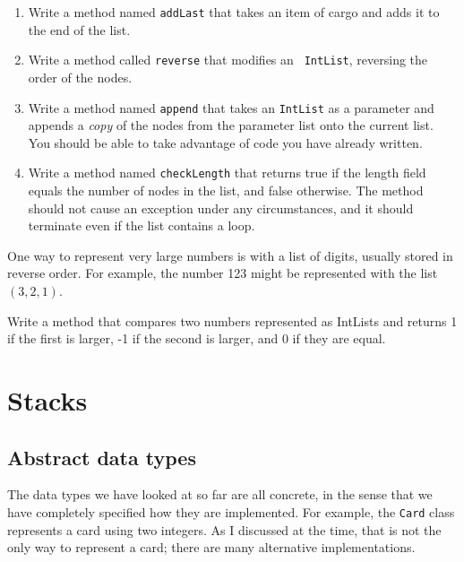 \begin{exercise}
\begin{enumerate}
\item Write a method named {\tt addLast} that takes an item of
cargo and adds it to the end of the list.

\item Write a method called {\tt reverse} that modifies an {\tt
IntList}, reversing the order of the nodes.

\item Write a method named {\tt append} that takes an {\tt IntList}
as a parameter and appends a {\em copy} of the nodes from the
parameter list onto the current list.  You should be able to take
advantage of code you have already written.

\item Write a method named {\tt checkLength} that returns true if the
length field equals the number of nodes in the list, and false
otherwise.  The method should not cause an exception under any
circumstances, and it should terminate even if the list contains a
loop.

\end{enumerate}
\end{exercise}


\begin{exercise}
One way to represent very large numbers is with a list of digits,
usually stored in reverse order.  For example, the number 123 might
be represented with the list $(3, 2, 1)$.

Write a method that compares two numbers represented as IntLists
and returns 1 if the first is larger, -1 if the second is larger, and
0 if they are equal.
\end{exercise}



\beforechapter
\label{chap15}
\chapter{Stacks}

\section{Abstract data types}

The data types we have looked at so far are all concrete, in the
sense that we have completely specified how they are implemented.
For example, the {\tt Card} class represents a card using two
integers.  As I discussed at the time, that is not the only way
to represent a card; there are many alternative implementations.

